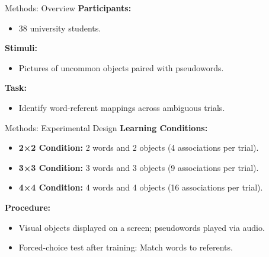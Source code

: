 \documentclass{beamer}
\begin{document}
	\begin{frame}{Methods: Overview}
		\textbf{Participants:}
		\begin{itemize}
			\item 38 university students.
		\end{itemize}
		\vspace{0.3cm}
		\textbf{Stimuli:}
		\begin{itemize}
			\item Pictures of uncommon objects paired with pseudowords.
		\end{itemize}
		\vspace{0.3cm}
		\textbf{Task:}
		\begin{itemize}
			\item Identify word-referent mappings across ambiguous trials.
		\end{itemize}
	\end{frame}
	
	\begin{frame}{Methods: Experimental Design}
		\textbf{Learning Conditions:}
		\begin{itemize}
			\item \textbf{2×2 Condition:} 2 words and 2 objects (4 associations per trial).
			\item \textbf{3×3 Condition:} 3 words and 3 objects (9 associations per trial).
			\item \textbf{4×4 Condition:} 4 words and 4 objects (16 associations per trial).
		\end{itemize}
		\vspace{0.3cm}
		\textbf{Procedure:}
		\begin{itemize}
			\item Visual objects displayed on a screen; pseudowords played via audio.
			\item Forced-choice test after training: Match words to referents.
		\end{itemize}
	\end{frame}
\end{document}
